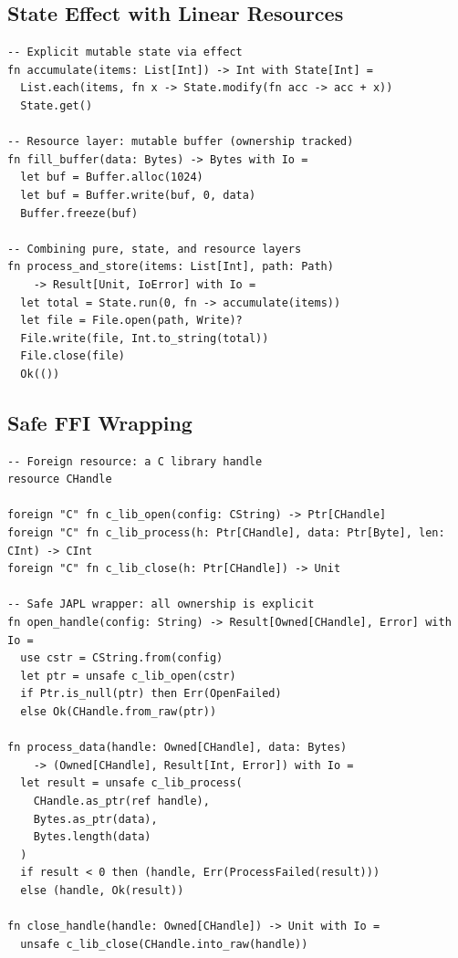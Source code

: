 \documentclass[11pt]{article}
\begin{document}
\subsection{State Effect with Linear Resources}

\begin{lstlisting}[caption={Composing effects with linear resources},label={lst:effect-compose}]
-- Explicit mutable state via effect
fn accumulate(items: List[Int]) -> Int with State[Int] =
  List.each(items, fn x -> State.modify(fn acc -> acc + x))
  State.get()

-- Resource layer: mutable buffer (ownership tracked)
fn fill_buffer(data: Bytes) -> Bytes with Io =
  let buf = Buffer.alloc(1024)
  let buf = Buffer.write(buf, 0, data)
  Buffer.freeze(buf)

-- Combining pure, state, and resource layers
fn process_and_store(items: List[Int], path: Path)
    -> Result[Unit, IoError] with Io =
  let total = State.run(0, fn -> accumulate(items))
  let file = File.open(path, Write)?
  File.write(file, Int.to_string(total))
  File.close(file)
  Ok(())
\end{lstlisting}

\subsection{Safe FFI Wrapping}

\begin{lstlisting}[caption={Safe wrapper around a C FFI resource},label={lst:ffi-wrap}]
-- Foreign resource: a C library handle
resource CHandle

foreign "C" fn c_lib_open(config: CString) -> Ptr[CHandle]
foreign "C" fn c_lib_process(h: Ptr[CHandle], data: Ptr[Byte], len: CInt) -> CInt
foreign "C" fn c_lib_close(h: Ptr[CHandle]) -> Unit

-- Safe JAPL wrapper: all ownership is explicit
fn open_handle(config: String) -> Result[Owned[CHandle], Error] with Io =
  use cstr = CString.from(config)
  let ptr = unsafe c_lib_open(cstr)
  if Ptr.is_null(ptr) then Err(OpenFailed)
  else Ok(CHandle.from_raw(ptr))

fn process_data(handle: Owned[CHandle], data: Bytes)
    -> (Owned[CHandle], Result[Int, Error]) with Io =
  let result = unsafe c_lib_process(
    CHandle.as_ptr(ref handle),
    Bytes.as_ptr(data),
    Bytes.length(data)
  )
  if result < 0 then (handle, Err(ProcessFailed(result)))
  else (handle, Ok(result))

fn close_handle(handle: Owned[CHandle]) -> Unit with Io =
  unsafe c_lib_close(CHandle.into_raw(handle))
\end{lstlisting}
\end{document}
